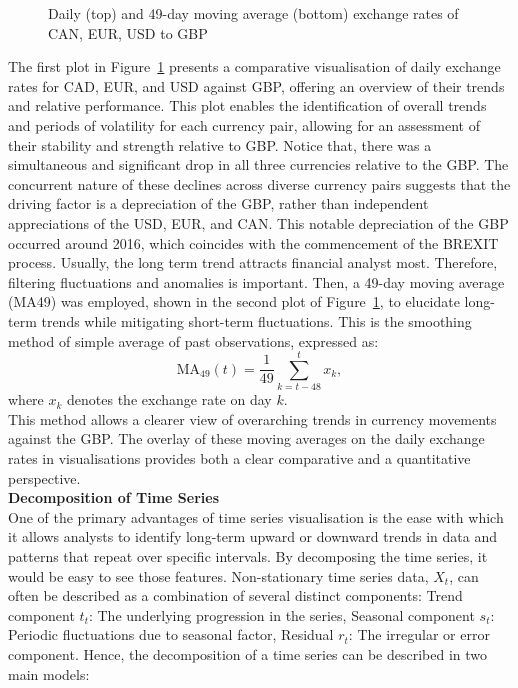 \documentclass{article}\usepackage[]{graphicx}\usepackage[]{xcolor}
\newenvironment{knitrout}{}{} %
\numberwithin{equation}{section}
\begin{document}
\begin{knitrout}
\begin{figure}[H]
{}

\caption[Daily (top) and 49-day moving average (bottom) exchange rates of CAN, EUR, USD to GBP]{Daily (top) and 49-day moving average (bottom) exchange rates of CAN, EUR, USD to GBP}\label{fig:all exchange rates}
\end{figure}

\end{knitrout}

\noindent
The first plot in Figure~\ref{fig:all exchange rates} presents a comparative visualisation of daily exchange rates for CAD, EUR, and USD against GBP, offering an overview of their trends and relative performance. This plot enables the identification of overall trends and periods of volatility for each currency pair, allowing for an assessment of their stability and strength relative to GBP. Notice that, there was a simultaneous and significant drop in all three currencies relative to the GBP. The concurrent nature of these declines across diverse currency pairs suggests that the driving factor is a depreciation of the GBP, rather than independent appreciations of the USD, EUR, and CAN. This notable depreciation of the GBP occurred around 2016, which coincides with the commencement of the BREXIT process. Usually, the long term trend attracts financial analyst most. Therefore, filtering fluctuations and anomalies is important. Then, a 49-day moving average (MA49) was employed, shown in the second plot of Figure~\ref{fig:all exchange rates}, to elucidate long-term trends while mitigating short-term fluctuations. This is the smoothing method of simple average of past observations, expressed as:
\[\text{MA}_{49}(t) = \frac{1}{49} \sum_{k=t-48}^{t} x_k,\] 
where \( x_k \) denotes the exchange rate on day $k$.\\

\noindent
This method allows a clearer view of overarching trends in currency movements against the GBP. The overlay of these moving averages on the daily exchange rates in visualisations provides both a clear comparative and a quantitative perspective.\\

\noindent
\textbf{Decomposition of Time Series}\\
\noindent
One of the primary advantages of time series visualisation is the ease with which it allows analysts to identify long-term upward or downward trends in data and patterns that repeat over specific intervals. By decomposing the time series, it would be easy to see those features. Non-stationary time series data, $X_t$, can often be described as a combination of several distinct components: Trend component $t_t$: The underlying progression in the series, Seasonal component $s_t$: Periodic fluctuations due to seasonal factor, Residual $r_t$: The irregular or error component. Hence, the decomposition of a time series can be described in two main models:
\\
\end{document}
